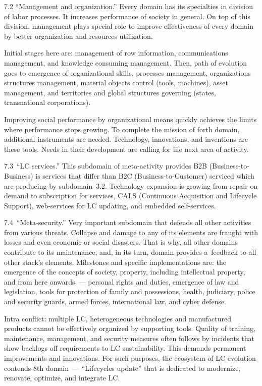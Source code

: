 \begin{multicols}{2}
 7.2 ``Management and organization.'' Every domain has its specialties in division
 of labor processes. It increases performance of society in general. On top
 of this division, management plays special role to
improve effectiveness of every domain by better organization and resources utilization.

 Initial stages here are: management of row information, communications management,
 and knowledge
consuming management. Then, path of evolution goes to emergence of organizational skills, processes
management, organizations structures management, material objects control
(tools, machines), asset
management, and
territories and global structures governing (states, transnational corporations).

 Improving social performance by organizational means quickly achieves
 the limits where performance stops growing. To complete the
 mission of forth domain, additional instruments are needed. Technology, innovations,
and inventions are these tools. Needs in their development are calling for
life next area of activity.

 7.3\ ``LC services.'' This subdomain of meta-activity provides B2B
 (Business-to-Business) is services that differ than B2C
 (Business-to-Customer) serviced
which are producing by subdomain~3.2. Technology expansion is growing from repair on demand to
subscription for services, CALS (Continuous Acquisition and Lifecycle Support),
web-services for LC updating, and embedded self-services.

 7.4\ ``Meta-security.'' Very important subdomain that defends all other
 activities from various threats.
Collapse and damage to any of its elements are
fraught with losses and even economic or social disasters.
That is why, all other domains contribute to its maintenance, and, in its turn, domain provides a~feedback to
all other stack's elements. Milestones and specific implementations are: the emergence of the concepts of
society, property, including intellectual property, and from here onwards~--- personal rights and duties,
emergence of law and legislation, tools for protection of family and possessions, health, judiciary, police
and security guards, armed forces, international law, and cyber defense.

 Intra conflict: multiple LC, heterogeneous technologies and manufactured products cannot be
effectively organized by supporting tools. Quality of training, maintenance,
management, and security
measures often follows by incidents that show backlogs off requirements to LC sustainability. This
demands permanent improvements and innovations. For such purposes, the ecosystem of LC evolution
contends 8th domain~--- ``Lifecycles update'' that is dedicated to modernize, renovate, optimize, and
integrate LC.


\end{multicols}
